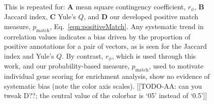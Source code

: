\documentclass[10pt,letterpaper]{article}
\begin{document}
{\begin{figure}[h]
{This is repeated for:
\textbf{A} mean square contingency coefficient, $r_\phi$,
\textbf{B} Jaccard index,
\textbf{C} Yule's $Q$, and
\textbf{D} our developed positive match measure, $p_\mathrm{match}$, Eq.~\eqref{eqn:positiveMatch}.
Any systematic trend in correlation values indicates a bias driven by the proportion of positive annotations for a pair of vectors, as is seen for the Jaccard index and Yule's $Q$.
By contrast, $r_\phi$, which is used through this work, and our probability-based measure, $p_\mathrm{match}$, used to motivate individual gene scoring for enrichment analysis, show no evidence of systematic bias (note the color axis scales).
[[TODO-AA: can you tweak D??; the central value of the colorbar is `05' instead of `0.5']]
}
\end{figure}


}
\end{document}
